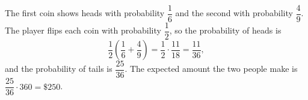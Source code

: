 The first coin shows heads with probability $\dfrac16$ and the second with probability $\dfrac49$. The player flips each coin with probability $\dfrac12$, so the probability of heads is
\[\dfrac12\left(\dfrac16+\dfrac49\right)=\dfrac12\cdot\dfrac{11}{18}=\dfrac{11}{36},\]
and the probability of tails is $\dfrac{25}{36}$. The expected amount the two people make is $\dfrac{25}{36}\cdot360=\boxed{\$250}$.
